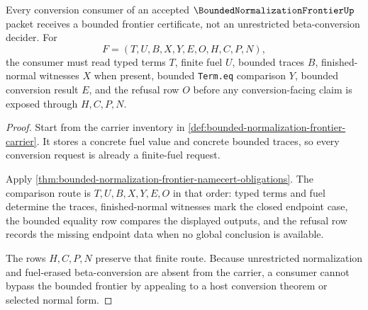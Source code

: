 \begin{theorem}
\label{thm:bounded-normalization-frontier-bounded-conversion-handoff}
Every conversion consumer of an accepted $\BoundedNormalizationFrontierUp$ packet receives a bounded frontier certificate, not an unrestricted beta-conversion decider. For
$$
F=(T,U,B,X,Y,E,O,H,C,P,N),
$$
the consumer must read typed terms $T$, finite fuel $U$, bounded traces $B$, finished-normal witnesses $X$ when present, bounded \texttt{Term.eq} comparison $Y$, bounded conversion result $E$, and the refusal row $O$ before any conversion-facing claim is exposed through $H,C,P,N$.
\end{theorem}
\begin{proof}
Start from the carrier inventory in \autoref{def:bounded-normalization-frontier-carrier}. It stores a concrete fuel value and concrete bounded traces, so every conversion request is already a finite-fuel request.

Apply \autoref{thm:bounded-normalization-frontier-namecert-obligations}. The comparison route is $T,U,B,X,Y,E,O$ in that order: typed terms and fuel determine the traces, finished-normal witnesses mark the closed endpoint case, the bounded equality row compares the displayed outputs, and the refusal row records the missing endpoint data when no global conclusion is available.

The rows $H,C,P,N$ preserve that finite route. Because unrestricted normalization and fuel-erased beta-conversion are absent from the carrier, a consumer cannot bypass the bounded frontier by appealing to a host conversion theorem or selected normal form.
\end{proof}


\begin{closurestatus}{\BoundedNormalizationFrontierUp}
  \theoryclosure{\seedClosure}
  \formalstatus{\unformalizedV}
\end{closurestatus}
